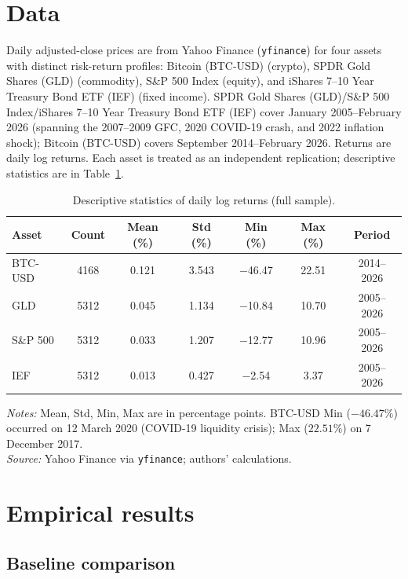 \documentclass[preprint,12pt,authoryear]{elsarticle}
\newcommand{\BTC}{Bitcoin (BTC-USD)}
\newcommand{\GLD}{SPDR Gold Shares (GLD)}
\newcommand{\SPX}{S\&P 500 Index}
\newcommand{\IEF}{iShares 7--10 Year Treasury Bond ETF (IEF)}
\begin{document}
\section{Data}

Daily adjusted-close prices are from Yahoo Finance (\texttt{yfinance}) for four assets with distinct risk-return profiles: \BTC{} (crypto), \GLD{} (commodity), \SPX{} (equity), and \IEF{} (fixed income). \GLD{}/\SPX{}/\IEF{} cover January 2005--February 2026 (spanning the 2007--2009 GFC, 2020 COVID-19 crash, and 2022 inflation shock); \BTC{} covers September 2014--February 2026. Returns are daily log returns. Each asset is treated as an independent replication; descriptive statistics are in Table~\ref{tab:data_summary}.

\begin{table}[!htbp]
\centering
\small
\setlength{\tabcolsep}{5pt}
\caption{Descriptive statistics of daily log returns (full sample).}
\label{tab:data_summary}
\begin{tabular}{lcccccc}
\toprule
Asset & Count & Mean (\%) & Std (\%) & Min (\%) & Max (\%) & Period \\
\midrule
BTC-USD & 4168 & 0.121 & 3.543 & $-$46.47 & 22.51 & 2014--2026 \\
GLD     & 5312 & 0.045 & 1.134 & $-$10.84 & 10.70 & 2005--2026 \\
S\&P 500 & 5312 & 0.033 & 1.207 & $-$12.77 & 10.96 & 2005--2026 \\
IEF     & 5312 & 0.013 & 0.427 & $-$2.54  & 3.37  & 2005--2026 \\
\bottomrule
\end{tabular}
\par\medskip
\footnotesize
\parbox{\linewidth}{\textit{Notes:} Mean, Std, Min, Max are in percentage points. BTC-USD Min ($-46.47\%$) occurred on 12 March 2020 (COVID-19 liquidity crisis); Max ($22.51\%$) on 7 December 2017. \\
\textit{Source:} Yahoo Finance via \texttt{yfinance}; authors' calculations.}
\end{table}

\section{Empirical results}

\subsection{Baseline comparison}
\end{document}

